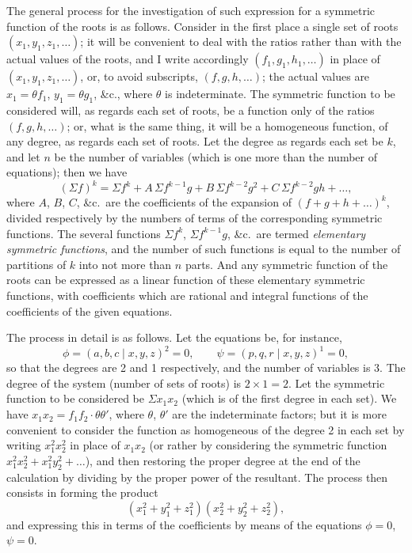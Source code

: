 \documentclass[11pt,a4paper]{article}
\begin{document}
The general process for the investigation of such expression for a symmetric
function of the roots is as follows. Consider in the first place a single set
of roots $(x_1, y_1, z_1, \ldots)$; it will be convenient to deal with the
ratios rather than with the actual values of the roots, and I write accordingly
$(f_1, g_1, h_1, \ldots)$ in place of $(x_1, y_1, z_1, \ldots)$, or, to
avoid subscripts, $(f, g, h, \ldots)$; the actual values are $x_1 = \theta f_1$,
$y_1 = \theta g_1$, \&c., where $\theta$ is indeterminate. The symmetric function
to be considered will, as regards each set of roots, be a function only of the
ratios $(f, g, h, \ldots)$; or, what is the same thing, it will be a
homogeneous function, of any degree, as regards each set of roots. Let the
degree as regards each set be $k$, and let $n$ be the number of variables
(which is one more than the number of equations); then we have
\[
(\Sigma f)^k = \Sigma f^k + A\, \Sigma f^{k-1}g + B\, \Sigma f^{k-2}g^2
+ C\, \Sigma f^{k-2}gh + \ldots,
\]
where $A$, $B$, $C$, \&c.\ are the coefficients of the expansion of
$(f + g + h + \ldots)^k$, divided respectively by the numbers of terms of the
corresponding symmetric functions. The several functions $\Sigma f^k$,
$\Sigma f^{k-1}g$, \&c.\ are termed \emph{elementary symmetric functions}, and
the number of such functions is equal to the number of partitions of $k$ into
not more than $n$ parts. And any symmetric function of the roots can be
expressed as a linear function of these elementary symmetric functions, with
coefficients which are rational and integral functions of the coefficients of
the given equations.

The process in detail is as follows. Let the equations be, for instance,
\[
\phi = (a, b, c \mid x, y, z)^2 = 0,
\qquad
\psi = (p, q, r \mid x, y, z)^1 = 0,
\]
so that the degrees are 2 and 1 respectively, and the number of variables is
3. The degree of the system (number of sets of roots) is $2 \times 1 = 2$.
Let the symmetric function to be considered be $\Sigma x_1 x_2$ (which is of
the first degree in each set). We have $x_1 x_2 = f_1 f_2 \cdot \theta\theta'$,
where $\theta$, $\theta'$ are the indeterminate factors; but it is more
convenient to consider the function as homogeneous of the degree 2 in each set
by writing $x_1^2 x_2^2$ in place of $x_1 x_2$ (or rather by considering the
symmetric function $x_1^2 x_2^2 + x_1^2 y_2^2 + \ldots$), and then restoring
the proper degree at the end of the calculation by dividing by the proper
power of the resultant. The process then consists in forming the product
\[
(x_1^2 + y_1^2 + z_1^2)(x_2^2 + y_2^2 + z_2^2),
\]
and expressing this in terms of the coefficients by means of the equations
$\phi = 0$, $\psi = 0$.
\end{document}

